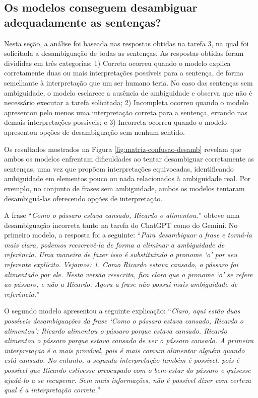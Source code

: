 \subsection{Os modelos conseguem desambiguar adequadamente as sentenças?}\label{resultados-q-3}

Nesta seção, a análise foi baseada nas respostas obtidas na tarefa 3, na qual foi solicitada a desambiguação de todas as sentenças. As respostas obtidas foram divididas em três categorias: 1) Correta ocorreu quando o modelo explica corretamente duas ou mais interpretações possíveis para a sentença, de forma semelhante à interpretação que um ser humano teria. No caso das sentenças sem ambiguidade, o modelo esclarece a ausência de ambiguidade e observa que não é necessário executar a tarefa solicitada; 2) Incompleta ocorreu quando o modelo apresentou pelo menos uma interpretação correta para a sentença, errando nas demais interpretações possíveis; e 3) Incorreta ocorreu quando o modelo apresentou opções de desambiguação sem nenhum sentido. 

Os resultados mostrados na Figura \ref{fig:matriz-confusao-desamb} revelam que ambos os modelos enfrentam dificuldades ao tentar desambiguar corretamente as sentenças, uma vez que propõem interpretações equivocadas, identificando ambiguidade em elementos pouco ou nada relacionados à ambiguidade real. Por exemplo, no conjunto de frases sem ambiguidade, ambos os modelos tentaram desambiguá-las oferecendo opções de interpretação. 

A frase \enquote{\emph{Como o pássaro estava cansado, Ricardo o alimentou.}} obteve uma desambiguação incorreta tanto na tarefa do ChatGPT como do Gemini. No primeiro modelo, a resposta foi a seguinte: \enquote{\emph{Para desambiguar a frase  e torná-la mais clara, podemos reescrevê-la de forma a eliminar a ambiguidade de referência. Uma maneira de fazer isso é substituindo o pronome \enquote{o} por seu referente explícito. Vejamos: 1. Como Ricardo estava cansado, o pássaro foi alimentado por ele. Nesta versão reescrita, fica claro que o pronome \enquote{o} se refere ao pássaro, e não a Ricardo. Agora a frase não possui mais ambiguidade de referência.}} 

O segundo modelo apresentou a seguinte explicação: \enquote{\emph{Claro, aqui estão duas possíveis desambiguações da frase \enquote{Como o pássaro estava cansado, Ricardo o alimentou}: Ricardo alimentou o pássaro porque estava cansado. Ricardo alimentou o pássaro porque estava cansado de ver o pássaro cansado. A primeira interpretação é a mais provável, pois é mais comum alimentar alguém quando está cansado. No entanto, a segunda interpretação também é possível, pois é possível que Ricardo estivesse preocupado com o bem-estar do pássaro e quisesse ajudá-lo a se recuperar. Sem mais informações, não é possível dizer com certeza qual é a interpretação correta.}}

